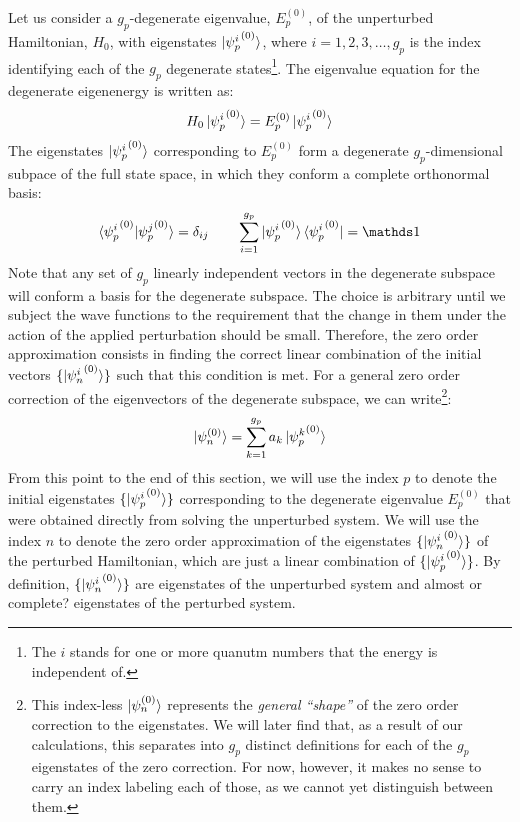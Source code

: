 Let us consider a $g_p$-degenerate eigenvalue, $E_p^{(0)}$, of the unperturbed Hamiltonian, $H_0$, with eigenstates $\ket{{\psi_p^i}^{(0)}}$, where $i = 1, 2, 3, \dots , g_p$ is the index identifying each of the $g_p$ degenerate states\footnote{The $i$ stands for one or more quanutm numbers that the energy is independent of.}. The eigenvalue equation for the degenerate eigenenergy is written as:
\begin{equation}
    H_0 \ket{{\psi_p^i}^{(0)}} = E_p^{(0)} \ket{{\psi_p^i}^{(0)}}
\end{equation}
The eigenstates $\ket{{\psi_p^i}^{(0)}}$ corresponding to $E_p^{(0)}$ form a degenerate $g_p$-dimensional subpace of the full state space, in which they conform a complete orthonormal basis:
\begin{equation}
    \braket{{\psi_p^i}^{(0)}|{\psi_p^j}^{(0)}} = \delta_{ij} \qquad \sum_{i=1}^{g_p} \ket{{\psi_p^i}^{(0)}}\bra{{\psi_p^i}^{(0)}} = \Imat
\end{equation}
Note that any set of $g_p$ linearly independent vectors in the degenerate subspace will conform a basis for the degenerate subspace. The choice is arbitrary until we subject the wave functions to the requirement that the change in them under the action of the applied perturbation should be small. Therefore, the zero order approximation consists in finding the correct linear combination of the initial vectors $\{\ket{{\psi_n^i}^{(0)}}\}$ such that this condition is met. For a general zero order correction of the eigenvectors of the degenerate subspace, we can write\footnote{This index-less $\ket{\psi_n^{(0)}}$ represents the \textit{general ``shape''} of the zero order correction to the eigenstates. We will later find that, as a result of our calculations, this separates into $g_p$ distinct definitions for each of the $g_p$ eigenstates of the zero correction. For now, however, it makes no sense to carry an index labeling each of those, as we cannot yet distinguish between them.}:
\begin{equation} \label{zero_order_approx_initial_def}
    \ket{\psi_n^{(0)}} = \sum_{k=1}^{g_p} a_k\ket{{\psi_p^k}^{(0)}}
\end{equation}
From this point to the end of this section, we will use the index $p$ to denote the initial eigenstates $\{\ket{{\psi_p^i}^{(0)}}\}$ corresponding to the degenerate eigenvalue $E_p^{(0)}$ that were obtained directly from solving the unperturbed system. We will use the index $n$ to denote the zero order approximation of the eigenstates $\{\ket{{\psi_n^i}^{(0)}}\}$ of the perturbed Hamiltonian, which are just a linear combination of $\{\ket{{\psi_p^i}^{(0)}}\}$. By definition, $\{\ket{{\psi_n^i}^{(0)}}\}$ are eigenstates of the unperturbed system and {\color{red}almost or complete?} eigenstates of the perturbed system.

